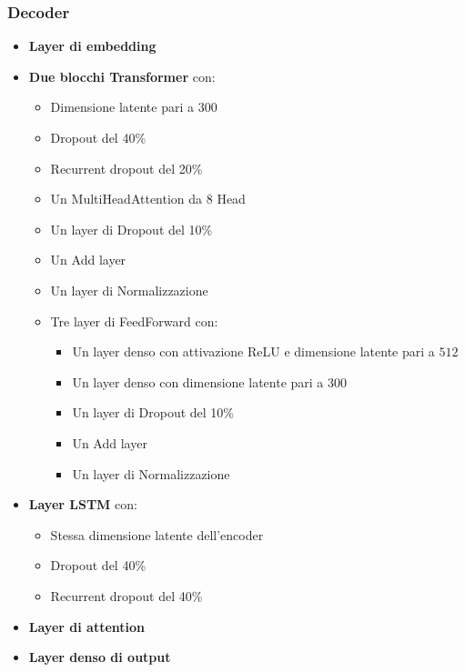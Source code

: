 \subsubsection{Decoder}
\begin{itemize}
    \item \textbf{Layer di embedding}
    \item \textbf{Due blocchi Transformer} con:
        \begin{itemize}
            \item Dimensione latente pari a 300
            \item Dropout del 40\%
            \item Recurrent dropout del 20\%
            \item Un MultiHeadAttention da \(8\) Head
            \item Un layer di Dropout del 10\%
            \item Un Add layer
            \item Un layer di Normalizzazione
            \item Tre layer di FeedForward con:
                \begin{itemize}
                    \item Un layer denso con attivazione ReLU e dimensione latente pari a \(512\)
                    \item Un layer denso con dimensione latente pari a \(300\)
                    \item Un layer di Dropout del 10\%
                    \item Un Add layer
                    \item Un layer di Normalizzazione
                \end{itemize}
        \end{itemize}
    \item \textbf{Layer LSTM} con:
        \begin{itemize}
            \item Stessa dimensione latente dell'encoder
            \item Dropout del 40\%
            \item Recurrent dropout del 40\%
        \end{itemize}
    \item \textbf{Layer di attention}
    \item \textbf{Layer denso di output}
\end{itemize}

